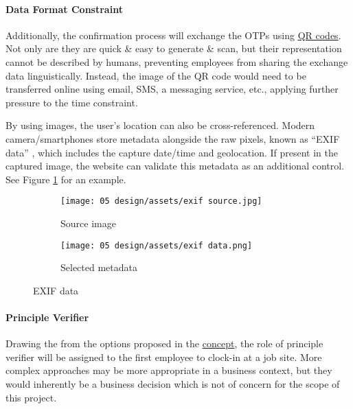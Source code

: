 \paragraph{Data Format Constraint}

Additionally, the confirmation process will exchange the
OTPs using \hyperref[ss:barcodes]{QR codes}.
Not only are they are quick \& easy to generate \& scan,
but their representation cannot be described by humans,
preventing employees from sharing the exchange data
linguistically.
Instead, the image of the QR code would need to be
transferred online using email, SMS, a messaging service,
etc., applying further pressure to the time constraint.

By using images, the user's location can also be
cross-referenced.
Modern camera/smartphones store metadata alongside the raw
pixels, known as \enquote{EXIF data} \parencite{exif},
which includes the capture date/time and geolocation.
If present in the captured image, the website can validate
this metadata as an additional control.
See Figure \ref{fig:exif} for an example.

\begin{figure}[h]
  \centering

  \begin{subfigure}{\subfigwidth}
    \centering
    \texttt{[image: 05
      design/assets/exif source.jpg]}
    \caption{Source image}
  \end{subfigure}
  \begin{subfigure}{\subfigwidth}
    \centering
    \texttt{[image: 05
      design/assets/exif data.png]}
    \caption{Selected metadata}
  \end{subfigure}

  \caption{EXIF data}
  \label{fig:exif}
\end{figure}

\paragraph{Principle Verifier}
Drawing the from the options proposed in the
\hyperref[s:concept]{concept}, the role of principle
verifier will be assigned to the first employee to
\gls{clock-in} at a job site.
More complex approaches may be more appropriate in a
business context, but they would inherently be a business
decision which is not of concern for the scope of this
project.
